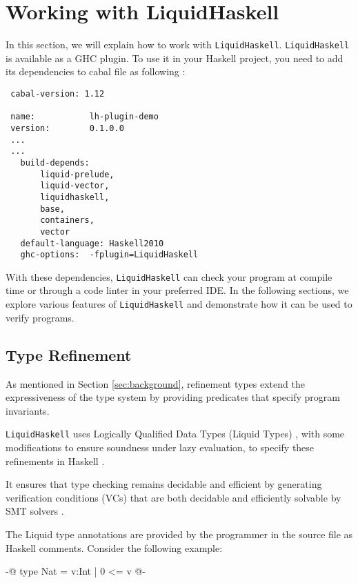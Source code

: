\documentclass[]{rptuseminar}
\begin{document}
\section{Working with \textbf{LiquidHaskell}}
\label{sec:lh}
In this section, we will explain how to work with \texttt{LiquidHaskell}.
\texttt{LiquidHaskell} is available as a GHC plugin. To use it in your Haskell project, you need to add its dependencies to cabal file as following \cite{noauthor_ucsd-progsyslh-plugin-demo_2024}:

\vspace{1em}
\begin{lstlisting}
 cabal-version: 1.12

 name:           lh-plugin-demo
 version:        0.1.0.0
 ...
 ...
   build-depends:
       liquid-prelude,
       liquid-vector,
       liquidhaskell,
       base,
       containers,
       vector
   default-language: Haskell2010
   ghc-options:  -fplugin=LiquidHaskell
\end{lstlisting}
\vspace{1em}

With these dependencies, \texttt{LiquidHaskell} can check your program at compile time or through a code linter in your preferred IDE.  
In the following sections, we explore various features of 
\texttt{LiquidHaskell} and demonstrate how it can be used to 
verify programs.


\subsection{Type Refinement}
As mentioned in Section \ref{sec:background}, refinement types extend the expressiveness 
of the type system by providing predicates that specify program invariants.

\texttt{LiquidHaskell} uses Logically Qualified Data Types (Liquid Types) \cite{rondonLiquidTypes2008}, 
with some modifications to ensure soundness under lazy evaluation, to specify these refinements in 
Haskell \cite{vazou_refinement_2014}.

It ensures that type checking remains decidable and efficient by generating verification conditions (VCs) 
that are both decidable and efficiently solvable by SMT solvers \cite{vazou_refinement_2014}.

The Liquid type annotations are provided by the programmer in the source file as Haskell comments. Consider the following example:

\begin{haskell}
 {-@ type Nat = {v:Int | 0 <= v} @-}
\end{haskell}
\end{document}
